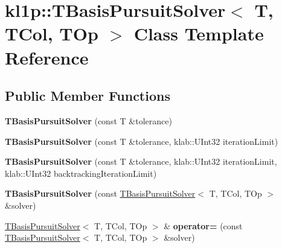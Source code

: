 \hypertarget{classkl1p_1_1TBasisPursuitSolver}{}\section{kl1p\+:\+:T\+Basis\+Pursuit\+Solver$<$ T, T\+Col, T\+Op $>$ Class Template Reference}
\label{classkl1p_1_1TBasisPursuitSolver}
\subsection*{Public Member Functions}
\begin{DoxyCompactItemize}
\item 
{\bfseries T\+Basis\+Pursuit\+Solver} (const T \&tolerance)\hypertarget{classkl1p_1_1TBasisPursuitSolver_abd12099eb0e9b9d135883ff752c5fee9}{}\label{classkl1p_1_1TBasisPursuitSolver_abd12099eb0e9b9d135883ff752c5fee9}

\item 
{\bfseries T\+Basis\+Pursuit\+Solver} (const T \&tolerance, klab\+::\+U\+Int32 iteration\+Limit)\hypertarget{classkl1p_1_1TBasisPursuitSolver_a4980542f6709c0a9ca157c74dd6a8ae3}{}\label{classkl1p_1_1TBasisPursuitSolver_a4980542f6709c0a9ca157c74dd6a8ae3}

\item 
{\bfseries T\+Basis\+Pursuit\+Solver} (const T \&tolerance, klab\+::\+U\+Int32 iteration\+Limit, klab\+::\+U\+Int32 backtracking\+Iteration\+Limit)\hypertarget{classkl1p_1_1TBasisPursuitSolver_aa3715e94e22870bba29d2b57eeaf96d0}{}\label{classkl1p_1_1TBasisPursuitSolver_aa3715e94e22870bba29d2b57eeaf96d0}

\item 
{\bfseries T\+Basis\+Pursuit\+Solver} (const \hyperlink{classkl1p_1_1TBasisPursuitSolver}{T\+Basis\+Pursuit\+Solver}$<$ T, T\+Col, T\+Op $>$ \&solver)\hypertarget{classkl1p_1_1TBasisPursuitSolver_ab28de8b87231ccbbbab55ee852576daa}{}\label{classkl1p_1_1TBasisPursuitSolver_ab28de8b87231ccbbbab55ee852576daa}

\item 
\hyperlink{classkl1p_1_1TBasisPursuitSolver}{T\+Basis\+Pursuit\+Solver}$<$ T, T\+Col, T\+Op $>$ \& {\bfseries operator=} (const \hyperlink{classkl1p_1_1TBasisPursuitSolver}{T\+Basis\+Pursuit\+Solver}$<$ T, T\+Col, T\+Op $>$ \&solver)\hypertarget{classkl1p_1_1TBasisPursuitSolver_a10d9657dd7a0f8669fcba1c556ccd04f}{}\label{classkl1p_1_1TBasisPursuitSolver_a10d9657dd7a0f8669fcba1c556ccd04f}


\end{DoxyCompactItemize}
